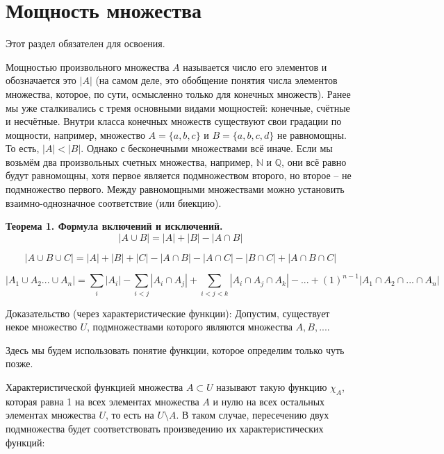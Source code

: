 \documentclass[a4paper]{book}
\begin{document}
\section{Мощность множества}
 Этот раздел обязателен для освоения. 
 
 Мощностью произвольного множества $A$ называется число его элементов и обозначается это $ | A |$ (на самом деле, это обобщение понятия числа элементов множества, которое, по сути, осмысленно только для конечных множеств). Ранее мы уже сталкивались с тремя основными видами мощностей: конечные, счётные и несчётные. Внутри класса конечных множеств существуют свои градации по мощности, например, множество $A = \{a,b,c\}$ и $B = \{a,b,c,d\}$ не равномощны. То есть, $| A | < | B |$. Однако с бесконечными множествами всё иначе. Если мы возьмём два произвольных счетных множества, например, $\mathbb{N}$ и $\mathbb{Q}$, они всё равно будут равномощны, хотя первое является подмножеством второго, но второе -- не подмножество первого. 
 Между равномощными множествами можно установить взаимно-однозначное соответствие (или биекцию).
 
 \textbf{Теорема 1. Формула включений и исключений.} 
\begin{equation}
 | A \cup B | = | A| + | B| - | A \cap B |
\end{equation}

\begin{equation}
| A \cup B \cup C| = | A| + | B| + | C| - | A \cap B| - | A \cap C| - | B \cap C| + | A \cap B \cap C|
\end{equation}

\begin{equation}
| A_1 \cup A_2 ... \cup A_n | = \sum_{i} | A_i| - \sum_{i<j} | A_i \cap A_j | + \sum_{i<j<k}  | A_i \cap A_j \cap A_k | - ... +(1)^{n-1}| A_1 \cap A_2 \cap ... \cap A_n |
\end{equation}

Доказательство (через характеристические функции): Допустим, существует некое множество $U$, подмножествами которого являются множества $A,B,...$. 

Здесь мы будем использовать понятие функции, которое определим только чуть позже. 

Характеристической функцией множества $A \subset U$ называют такую функцию $\chi_A$, которая равна 1 на всех элементах множества $A$ и нулю на всех остальных элементах множества $U$, то есть на $U\setminus A$. В таком случае, пересечению двух подмножества будет соответствовать произведению их характеристических функций: 
\end{document}
